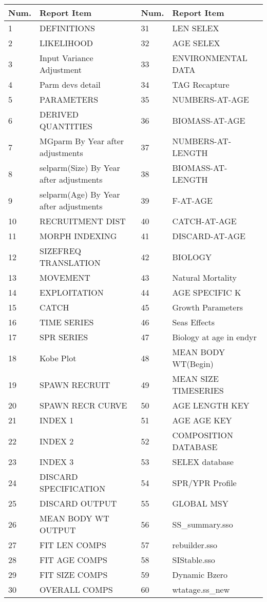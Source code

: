 \begin{center}
	\begin{longtable}{p{1cm} p{6.5cm}p{1cm} p{6cm}}
		\hline
		Num. & Report Item & Num. & Report Item\Tstrut\Bstrut\\
		\hline
1	& DEFINITIONS				    &	31	&	LEN	SELEX	\\			
2	& LIKELIHOOD					&	32	&	AGE	SELEX	\\			
3	& Input Variance Adjustment	    &	33	&	ENVIRONMENTAL	DATA	\\			
4	& Parm devs detail			    &	34	&	TAG	Recapture	\\			
5	& PARAMETERS					&	35	&	NUMBERS-AT-AGE	\\				
6	& DERIVED	QUANTITIES			&	36	&	BIOMASS-AT-AGE	\\				
7	& MGparm By Year after adjustments	&	37	& NUMBERS-AT-LENGTH	\\				
8	& selparm(Size) By Year after adjustments & 38 & BIOMASS-AT-LENGTH	\\				
9	& selparm(Age) By Year after adjustments  &	39 & F-AT-AGE	\\				
10	& RECRUITMENT	DIST			&	40	& CATCH-AT-AGE	\\				
11	& MORPH	INDEXING				&	41	& DISCARD-AT-AGE	\\				
12	& SIZEFREQ	TRANSLATION			&	42	&	BIOLOGY	\\				
13	& MOVEMENT					    &	43	&	Natural	Mortality	\\			
14	& EXPLOITATION					&	44	&	AGE	SPECIFIC	K	\\		
15	& CATCH					        &	45	&	Growth	Parameters	\\			
16	& TIME	SERIES				    &	46	&	Seas	Effects	\\			
17	& SPR	SERIES				    &	47	&	Biology	at	age	in	endyr	\\
18	& Kobe	Plot				    &	48	&	MEAN	BODY	WT(Begin)	\\		
19	& SPAWN	RECRUIT				    &	49	&	MEAN	SIZE	TIMESERIES	\\		
20	& SPAWN	RECR	CURVE			&	50	&	AGE	LENGTH	KEY	\\		
21	& INDEX	1				        &	51	&	AGE	AGE	KEY	\\		
22	& INDEX	2				        &	52	&	COMPOSITION	DATABASE	\\			
23	& INDEX	3				        &	53	&	SELEX	database	\\			
24	& DISCARD	SPECIFICATION		&	54	&	SPR/YPR	Profile	\\			
25	& DISCARD	OUTPUT				&	55	&	GLOBAL	MSY	\\			
26	& MEAN	BODY	WT	OUTPUT		&	56	&	SS\_summary.sso	\\				
27	& FIT	LEN	COMPS			    &	57	&	rebuilder.sso	\\				
28	& FIT	AGE	COMPS			    &	58	&	SIStable.sso	\\				
29	& FIT	SIZE	COMPS			&	59	&	Dynamic	Bzero	\\			
30	& OVERALL	COMPS				&	60	&	wtatage.ss\_new	\\				
\hline
	\end{longtable}
\end{center}

